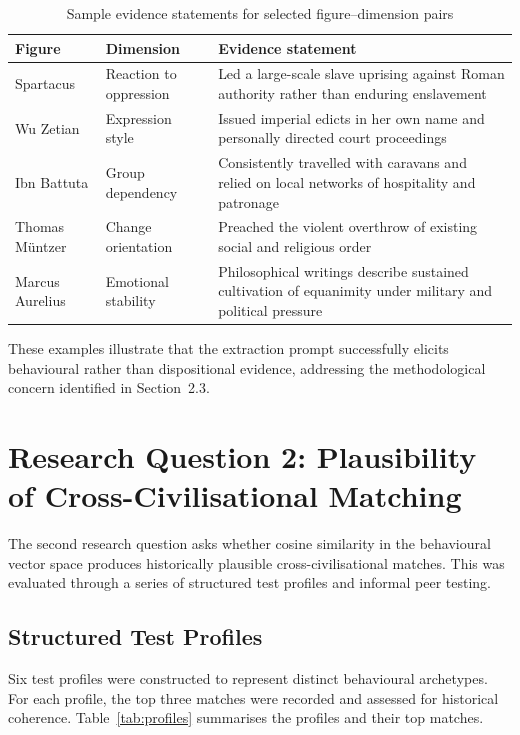 \documentclass[11pt, a4paper]{report}
\begin{document}
\begin{table}[H]
  \centering
  \caption{Sample evidence statements for selected figure–dimension pairs}
  \label{tab:evidence}
  \begin{tabular}{p{3cm}p{3.5cm}p{6cm}}
    \toprule
    Figure & Dimension & Evidence statement \\
    \midrule
    Spartacus & Reaction to oppression & Led a large-scale slave uprising against Roman authority rather than enduring enslavement \\
    Wu Zetian & Expression style & Issued imperial edicts in her own name and personally directed court proceedings \\
    Ibn Battuta & Group dependency & Consistently travelled with caravans and relied on local networks of hospitality and patronage \\
    Thomas M\"{u}ntzer & Change orientation & Preached the violent overthrow of existing social and religious order \\
    Marcus Aurelius & Emotional stability & Philosophical writings describe sustained cultivation of equanimity under military and political pressure \\
    \bottomrule
  \end{tabular}
\end{table}

These examples illustrate that the extraction prompt successfully elicits behavioural rather than dispositional evidence, addressing the methodological concern identified in Section~2.3.

\section{Research Question 2: Plausibility of Cross-Civilisational Matching}

The second research question asks whether cosine similarity in the behavioural vector space produces historically plausible cross-civilisational matches. This was evaluated through a series of structured test profiles and informal peer testing.

\subsection{Structured Test Profiles}

Six test profiles were constructed to represent distinct behavioural archetypes. For each profile, the top three matches were recorded and assessed for historical coherence. Table~\ref{tab:profiles} summarises the profiles and their top matches.
\end{document}
